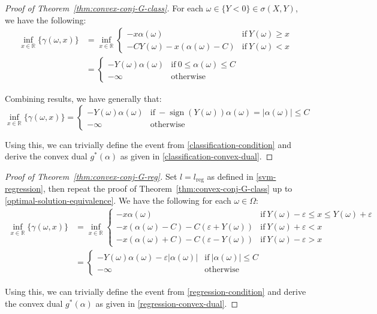 \documentclass{article}
\begin{document}
\begin{proof}[Proof of Theorem~\ref{thm:convex-conj-G-class}]
For each $\omega \in \{Y < 0\} \in \sigma(X, Y)$, we have the following: 
\begin{align}
\inf_{x \in \mathbb{R}}\{\gamma(\omega, x)\} & = \inf_{x \in \mathbb{R}} \begin{cases}
 - x \alpha(\omega) &\text{if}\ Y(\omega) \geq x \\
 - C Y(\omega) - x (\alpha(\omega) - C) &\text{if}\ Y(\omega) < x
\end{cases} \\
 & = \begin{cases}
 - Y(\omega) \alpha(\omega) &\text{if}\ 0 \leq \alpha(\omega) \leq C \\
 -\infty & \text{otherwise}
\end{cases}
\end{align}

Combining results, we have generally that: 
\begin{equation}
\inf_{x \in \mathbb{R}}\{\gamma(\omega, x)\} = \begin{cases}
 - Y(\omega) \alpha(\omega) &\text{if}\ -\operatorname{sign}(Y(\omega))\alpha(\omega) = |\alpha(\omega)| \le C  \\
 -\infty & \text{otherwise}
\end{cases}
\end{equation}

Using this, we can trivially define the event from \ref{classification-condition} and derive the convex dual $g^{*}(\alpha)$ as given in \ref{classification-convex-dual}. 
\end{proof}

\begin{proof}[Proof of Theorem~\ref{thm:convex-conj-G-reg}]
Set $l = l_{\text{reg}}$ as defined in \ref{svm-regression}, then repeat the proof of Theorem~\ref{thm:convex-conj-G-class} up to \ref{optimal-solution-equivalence}. We have the following for each $\omega \in \Omega$:
\begin{align}
\inf_{x \in \mathbb{R}}\{\gamma(\omega, x)\} & = \inf_{x \in \mathbb{R}} \begin{cases}
 - x \alpha(\omega) &\text{if}\ Y(\omega) - \varepsilon \leq x \leq Y(\omega) + \varepsilon \\
 - x (\alpha(\omega) - C) - C(\varepsilon + Y(\omega)) &\text{if}\ Y(\omega) + \varepsilon < x \\
 - x(\alpha(\omega) + C) - C(\varepsilon - Y(\omega)) &\text{if}\ Y(\omega) -\varepsilon > x
\end{cases} \\
 & = \begin{cases}
 - Y(\omega) \alpha(\omega) - \varepsilon |\alpha(\omega)| &\text{if}\ |\alpha(\omega)| \leq C \\
 - \infty & \text{otherwise}
\end{cases}
\end{align}

Using this, we can trivially define the event from \ref{regression-condition} and derive the convex dual $g^{*}(\alpha)$ as given in \ref{regression-convex-dual}. 
\end{proof}
\end{document}
